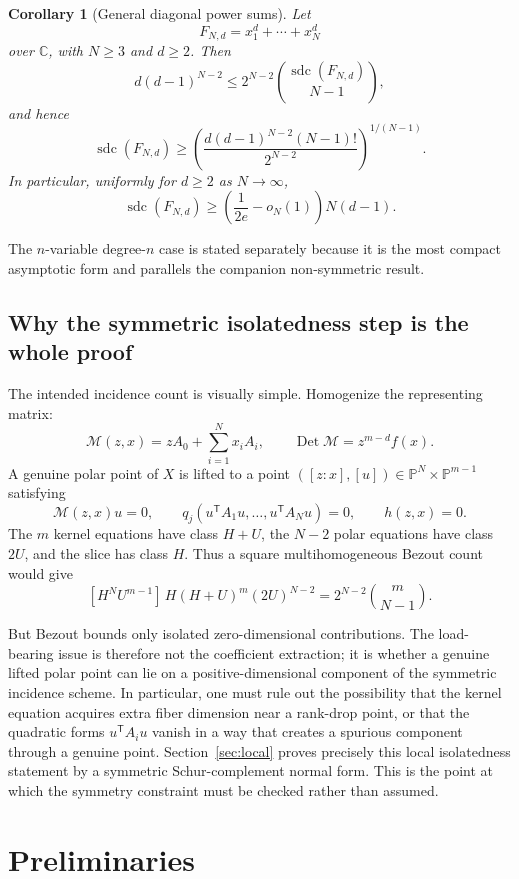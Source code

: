 \documentclass[11pt]{article}
\theoremstyle{plain}
\newtheorem{corollary}{Corollary}
\theoremstyle{definition}
\DeclareMathOperator{\sdc}{sdc}
\DeclareMathOperator{\Det}{Det}
\newcommand{\PP}{\mathbb{P}}
\newcommand{\CC}{\mathbb{C}}
\newcommand{\Mcal}{\mathcal M}
\begin{document}
\begin{corollary}[General diagonal power sums]
\label{cor:diagonal-general}
Let
\[
  F_{N,d}=x_1^d+\cdots+x_N^d
\]
over $\CC$, with $N\ge3$ and $d\ge2$.  Then
\[
  d(d-1)^{N-2}
  \le 2^{N-2}\binom{\sdc(F_{N,d})}{N-1},
\]
and hence
\[
  \sdc(F_{N,d})
  \ge
  \left(
  \frac{d(d-1)^{N-2}(N-1)!}{2^{N-2}}
  \right)^{1/(N-1)}.
\]
In particular, uniformly for $d\ge2$ as $N\to\infty$,
\[
  \sdc(F_{N,d})
  \ge \left(\frac{1}{2e}-o_N(1)\right)N(d-1).
\]
\end{corollary}

The $n$-variable degree-$n$ case is stated separately because it is the most
compact asymptotic form and parallels the companion non-symmetric result.

\subsection{Why the symmetric isolatedness step is the whole proof}

The intended incidence count is visually simple.  Homogenize the representing
matrix:
\[
  \Mcal(z,x)=zA_0+\sum_{i=1}^N x_iA_i,
  \qquad \Det\Mcal=z^{m-d}f(x).
\]
A genuine polar point of $X$ is lifted to a point
$([z:x],[u])\in\PP^N\times\PP^{m-1}$ satisfying
\[
  \Mcal(z,x)u=0,
  \qquad
  q_j(u^{\mathsf T}A_1u,\ldots,u^{\mathsf T}A_Nu)=0,
  \qquad
  h(z,x)=0.
\]
The $m$ kernel equations have class $H+U$, the $N-2$ polar equations have class
$2U$, and the slice has class $H$.  Thus a square multihomogeneous Bezout count
would give
\[
  [H^N U^{m-1}]\,H(H+U)^m(2U)^{N-2}
  =2^{N-2}\binom{m}{N-1}.
\]

But Bezout bounds only isolated zero-dimensional contributions.  The
load-bearing issue is therefore not the coefficient extraction; it is whether a
genuine lifted polar point can lie on a positive-dimensional component of the
symmetric incidence scheme.  In particular, one must rule out the possibility
that the kernel equation acquires extra fiber dimension near a rank-drop point,
or that the quadratic forms $u^{\mathsf T}A_i u$ vanish in a way that creates a
spurious component through a genuine point.  Section~\ref{sec:local} proves
precisely this local isolatedness statement by a symmetric Schur-complement
normal form.  This is the point at which the symmetry constraint must be checked
rather than assumed.

\section{Preliminaries}
\label{sec:prelim}
\end{document}
